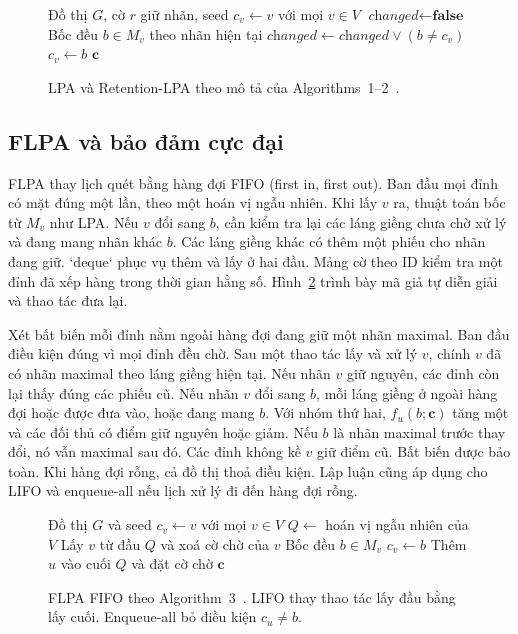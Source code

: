 \begin{figure}[!t]
\footnotesize
\begin{algorithmic}[1]
  \Require Đồ thị $G$, cờ $r$ giữ nhãn, seed
  \State $c_v\gets v$ với mọi $v\in V$
  \Repeat
    \State $\textit{changed}\gets\textbf{false}$
        \State Bốc đều $b\in M_v$ theo nhãn hiện tại
        \State $\textit{changed}\gets\textit{changed}\lor(b\ne c_v)$
        \State $c_v\gets b$
      \EndIf
    \EndFor
  \State \Return $\mathbf{c}$
\end{algorithmic}
\caption{LPA và Retention-LPA theo mô tả của Algorithms~1–2~\cite{flpa}.}
\label{fig:sweeps}
\end{figure}

\subsection{FLPA và bảo đảm cực đại}

FLPA thay lịch quét bằng hàng đợi FIFO (first in, first out). Ban đầu mọi đỉnh có mặt đúng một lần, theo một hoán vị ngẫu nhiên. Khi lấy $v$ ra, thuật toán bốc từ $M_v$ như LPA. Nếu $v$ đổi sang $b$, cần kiểm tra lại các láng giềng chưa chờ xử lý và đang mang nhãn khác $b$. Các láng giềng khác có thêm một phiếu cho nhãn đang giữ. `deque` phục vụ thêm và lấy ở hai đầu. Mảng cờ theo ID kiểm tra một đỉnh đã xếp hàng trong thời gian hằng số. Hình~\ref{fig:queue} trình bày mã giả tự diễn giải và thao tác đưa lại.

Xét bất biến mỗi đỉnh nằm ngoài hàng đợi đang giữ một nhãn maximal. Ban đầu điều kiện đúng vì mọi đỉnh đều chờ. Sau một thao tác lấy và xử lý $v$, chính $v$ đã có nhãn maximal theo láng giềng hiện tại. Nếu nhãn $v$ giữ nguyên, các đỉnh còn lại thấy đúng các phiếu cũ. Nếu nhãn $v$ đổi sang $b$, mỗi láng giềng ở ngoài hàng đợi hoặc được đưa vào, hoặc đang mang $b$. Với nhóm thứ hai, $f_u(b;\mathbf{c})$ tăng một và các đối thủ có điểm giữ nguyên hoặc giảm. Nếu $b$ là nhãn maximal trước thay đổi, nó vẫn maximal sau đó. Các đỉnh không kề $v$ giữ điểm cũ. Bất biến được bảo toàn. Khi hàng đợi rỗng, cả đồ thị thoả điều kiện. Lập luận cũng áp dụng cho LIFO và enqueue-all nếu lịch xử lý đi đến hàng đợi rỗng.

\begin{figure}[!t]
\footnotesize
\begin{algorithmic}[1]
  \Require Đồ thị $G$ và seed
  \State $c_v\gets v$ với mọi $v\in V$
  \State $Q\gets$ hoán vị ngẫu nhiên của $V$
    \State Lấy $v$ từ đầu $Q$ và xoá cờ chờ của $v$
      \State Bốc đều $b\in M_v$
        \State $c_v\gets b$
          \State Thêm $u$ vào cuối $Q$ và đặt cờ chờ
        \EndFor
      \EndIf
    \EndIf
  \EndWhile
  \State \Return $\mathbf{c}$
\end{algorithmic}
\caption{FLPA FIFO theo Algorithm~3~\cite{flpa}. LIFO thay thao tác lấy đầu bằng lấy cuối. Enqueue-all bỏ điều kiện $c_u\ne b$.}
\label{fig:queue}
\end{figure}

